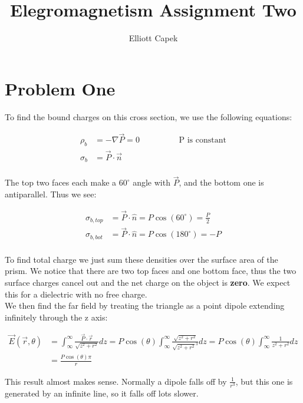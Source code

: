 \documentclass[10pt]{article} %
\title{Elegromagnetism Assignment Two}
\author{Elliott Capek}
\begin{document}
\maketitle{}

\section{Problem One}
To find the bound charges on this cross section, we use the following equations:

\begin{align*}
  \rho_b &= -\nabla \vec{P} = 0\hspace{2cm} \mbox{P is constant}\\
  \sigma_b &= \vec{P} \cdot \vec{n}\\
\end{align*}

The top two faces each make a $60^\circ$ angle with $\vec{P}$, and the bottom one is antiparallel. Thus we see:

\begin{align*}
  \sigma_{b,top} &= \vec{P} \cdot \hat{n} = P\cos\left(60^\circ\right) = \frac P2\\
  \sigma_{b,bot} &= \vec{P} \cdot \hat{n} = P\cos\left(180^\circ\right) = -P\\
\end{align*}

To find total charge we just sum these densities over the surface area of the prism. We notice that there are two top faces and one
bottom face, thus the two surface charges cancel out and the net charge on the object is \textbf{zero}. We expect this for a dielectric with no free charge.\\

We then find the far field by treating the triangle as a point dipole extending infinitely through the z axis:

\begin{align*}
  \vec{E}(\vec{r}, \theta) &= \int_\infty^\infty \frac{\vec{P}\cdot\vec{r}}{\sqrt{z^2+r^2}}dz
  = P\cos(\theta)\int_\infty^\infty \frac{\sqrt{z^2+r^2}}{\sqrt{z^2+r^2}^3}dz
  = P\cos(\theta)\int_\infty^\infty \frac{1}{z^2+r^2}dz\\
  &= \frac{P\cos(\theta)\pi}{r}
\end{align*}

This result almost makes sense. Normally a dipole falls off by $\frac{1}{r^3}$, but this one is generated by an infinite line, so it
falls off lots slower.\\
\end{document}
